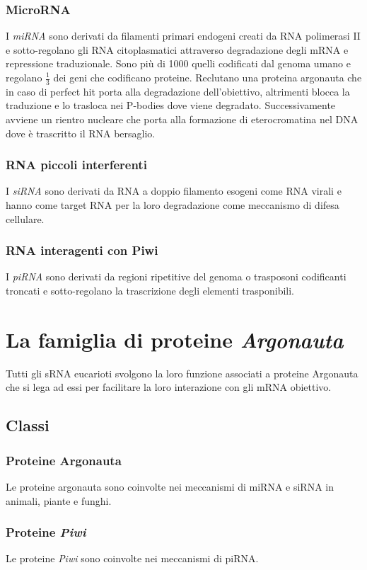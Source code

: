 \subsubsection{MicroRNA}
I \emph{miRNA} sono derivati da filamenti primari endogeni creati da RNA polimerasi II e sotto-regolano gli RNA citoplasmatici attraverso degradazione degli mRNA e repressione 
traduzionale. Sono pi\`u di \num{1000} quelli codificati dal genoma umano e regolano $\frac{1}{3}$ dei geni che codificano proteine. Reclutano una proteina argonauta che in caso
di perfect hit porta alla degradazione dell'obiettivo, altrimenti blocca la traduzione e lo trasloca nei P-bodies dove viene degradato. Successivamente avviene un rientro nucleare che
porta alla formazione di eterocromatina nel DNA dove \`e trascritto il RNA bersaglio. 
\subsubsection{RNA piccoli interferenti}
I \emph{siRNA} sono derivati da RNA a doppio filamento esogeni come RNA virali e hanno come target RNA per la loro degradazione come meccanismo di difesa cellulare.
\subsubsection{RNA interagenti con Piwi}
I \emph{piRNA} sono derivati da regioni ripetitive del genoma o trasposoni codificanti troncati e sotto-regolano la trascrizione degli elementi trasponibili. 
\section{La famiglia di proteine \emph{Argonauta}}
Tutti gli sRNA eucarioti svolgono la loro funzione associati a proteine Argonauta che si lega ad essi per facilitare la loro interazione con gli mRNA obiettivo.
\subsection{Classi}
\subsubsection{Proteine Argonauta}
Le proteine argonauta sono coinvolte nei meccanismi di miRNA e siRNA in animali, piante e funghi. 
\subsubsection{Proteine \emph{Piwi}}
Le proteine \emph{Piwi} sono coinvolte nei meccanismi di piRNA.
